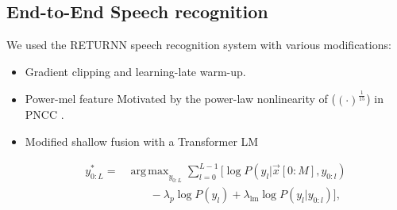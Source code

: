 \documentclass[a0,portrait]{a0poster}
\DeclareMathOperator*{\argmax}{arg\,max}
\begin{document}
\begin{multicols}{2}

%




\section{End-to-End Speech recognition}

\begin{minipage}{1.0\linewidth}
  {
    \normalsize
  \begin{center}
  \resizebox{180mm}{!}{}
  \end{center}
  }
\end{minipage}


  We used the RETURNN speech recognition system
  \cite{a_zeyer_interspeech_2018_00} with various modifications:
    \begin{itemize}
      \item{Gradient clipping and learning-late warm-up.}
      \item{Power-mel feature} Motivated by the power-law nonlinearity of ($(\cdot)^{\frac{1}{15}}$) in PNCC \cite{C_Kim_IEEETran_2016_1}.
      \item{Modified shallow fusion with a Transformer LM}


        \begin{align}
  y_{0:L}^{*} = & \argmax_{y_{0:L}} \sum_{l=0}^{L-1} \Big[ \log P \left(y_l
  |\vec{x}[0:M], y_{0:l} \right)
  \nonumber \\
                           & \qquad - \lambda_p \log P(y_l)
                           + \lambda_{\text{lm}} \log P \left(y_l   |y_{0:l} \right)  \Big],
                           \label{eq:lm_fusion}
\end{align}




\end{itemize}
\end{multicols}
\end{document}

